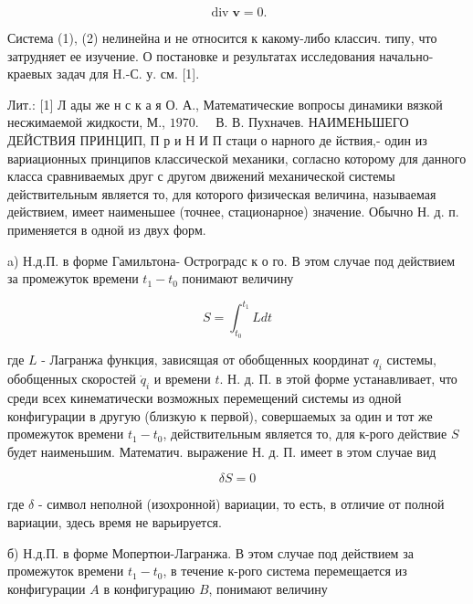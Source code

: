 \documentclass[10pt]{article}
\begin{document}
\[

\operatorname{div} \boldsymbol{v}=0 .

\]



Система (1), (2) нелинейна и не относится к какому-либо классич. типу, что затрудняет ее изучение. О постановке и результатах исследования начально-краевых задач для H.-С. у. см. [1].



Лит.: [1] Л ады же н с к а я О. А., Математические вопросы динамики вязкой несжимаемой жидкости, М., $1970 . \quad$ В. В. Пухначев. НАИМЕНЬШЕГО ДЕЙСТВИЯ ПРИНЦИП, П р и Н И П стаци о нарного де йствия,- один из вариационных принципов классической механики, согласно которому для данного класса сравниваемых друг с другом движений механической системы действительным является то, для которого физическая величина, называемая действием, имеет наименьшее (точнее, стационарное) значение. Обычно Н. д. п. применяется в одной из двух форм.



a) Н.д.П. в форме Гамильтона- Остроградс к о го. В этом случае под действием за промежуток времени $t_{1}-t_{0}$ понимают величину



\[

S=\int_{t_{0}}^{t_{1}} L d t

\]



где $L$ - Лагранжа функция, зависящая от обобщенных координат $q_{i}$ системы, обобщенных скоростей $\dot{q}_{i}$ и времени $t$. Н. д. П. в этой форме устанавливает, что среди всех кинематически возможных перемещений системы из одной конфигурации в другую (близкую к первой), совершаемых за один и тот же промежуток времени $t_{1}-t_{0}$, действительным является то, для к-рого действие $S$ будет наименьшим. Математич. выражение Н. д. П. имеет в этом случае вид



\[

\delta S=0

\]



где $\delta$ - символ неполной (изохронной) вариации, то есть, в отличие от полной вариации, здесь время не варьируется.



б) Н.д.П. в форме Мопертюи-Лагранжа. В этом случае под действием за промежуток времени $t_{1}-t_{0}$, в течение к-рого система перемещается из конфигурации $A$ в конфигурацию $B$, понимают величину
\end{document}
